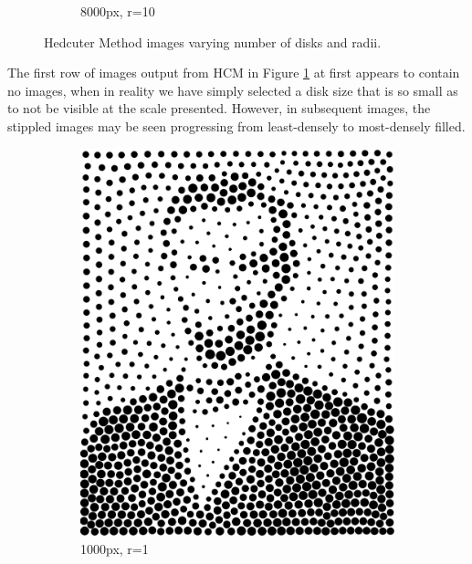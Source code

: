\documentclass[11pt]{article}
\begin{document}
\begin{figure}[H]
\begin{subfigure}[b]{0.2\linewidth}
		\caption{8000px, r=10}
	\end{subfigure}
	\caption{Hedcuter Method images varying number of disks and radii.}
	\label{fig:hc_points1}
\end{figure}

The first row of images output from HCM in Figure \ref{fig:hc_points1} at first appears to contain no images, when in reality we have simply selected a disk size that is so small as to not be visible at the scale presented. However, in subsequent images, the stippled images may be seen progressing from least-densely to most-densely filled. 


\begin{figure}[H]
	\centering
	\begin{subfigure}[b]{0.2\linewidth}
		\includegraphics[width=\linewidth]{pix/vr_AL_1000_r1.png}
		\caption{1000px, r=1}
	\end{subfigure}
	\begin{subfigure}[b]{0.2\linewidth}

\end{subfigure}
\end{figure}
\end{document}
